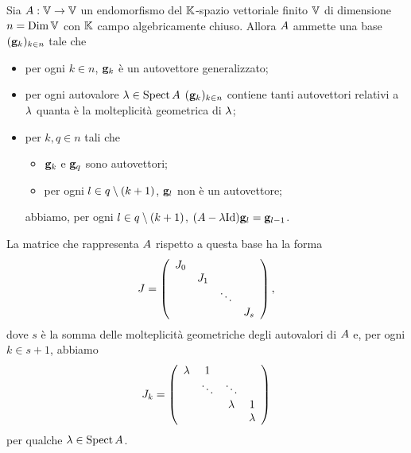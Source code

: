 \begin{Theorem}
	Sia $A: \mathbb{V} \rightarrow \mathbb{V}$ un
  endomorfismo del $\mathbb{K}$-spazio vettoriale finito $\mathbb{V}$ di
  dimensione $n = \operatorname{\operatorname{Dim}}{\mathbb{V}}$ con $\mathbb{K}$ campo algebricamente
  chiuso. Allora $A$ ammette una base
  $(\GeneralizedEigenvector_k)_{k \in n}$ tale che
  \begin{itemize}
    \item per ogni $k \in n$, $\GeneralizedEigenvector_k$ \`e un autovettore
      generalizzato;
    \item per ogni autovalore $\lambda \in \operatorname{Spect}{A}$
      $(\GeneralizedEigenvector_k)_{k\in n}$ contiene tanti autovettori relativi
      a $\lambda$ quanta \`e la molteplicit\`a geometrica di $\lambda$;
    \item per $k, q \in n$ tali che
      \begin{itemize}
        \item $\GeneralizedEigenvector_k$ e $\GeneralizedEigenvector_q$
              sono autovettori;
        \item per ogni $l \in q \setminus (k + 1)$, $\GeneralizedEigenvector_l$ non
              \`e un autovettore;
      \end{itemize}
      abbiamo, per ogni $l \in q \setminus (k +  1)$,
      $(\LinearTransformation - \Eigenvalue \Identity)\GeneralizedEigenvector_l
      = \GeneralizedEigenvector_{l - 1}$.
  \end{itemize}
  La matrice che rappresenta $A$ rispetto a questa base ha
  la forma
  \[
    J =
    \left (
      \begin{array}{cccc}
        J_0 &     &         &\\
            & J_1 &         &\\
            &     & \ddots  &\\
            &     &         & J_s
      \end{array}
    \right ),
  \]
  dove $s$ \`e la somma delle molteplicit\`a geometriche degli autovalori di
  $A$ e, per ogni $k \in s + 1$, abbiamo
  \[
    J_k =
    \left (
      \begin{array}{cccc}
        \lambda & 1       &             &\\
                    & \ddots  & \ddots      &\\
                    &         & \lambda & 1\\
                    &         &             & \lambda
      \end{array}
    \right )
  \]
  per qualche $\lambda \in \operatorname{Spect}{A}$.
\end{Theorem}
